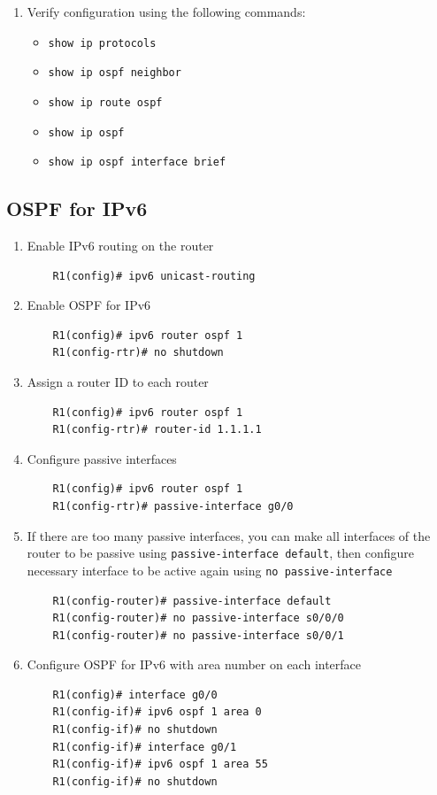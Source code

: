 \begin{enumerate}
\item Verify configuration using the following commands:
	\begin{itemize}
	\item \verb|show ip protocols|
	\item \verb|show ip ospf neighbor|
	\item \verb|show ip route ospf|
	\item \verb|show ip ospf|
	\item \verb|show ip ospf interface brief|
	\end{itemize}		
\end{enumerate}

\subsection{OSPF for IPv6}

\begin{enumerate}
\item Enable IPv6 routing on the router
	\begin{verbatim}
	R1(config)# ipv6 unicast-routing 
	\end{verbatim}
	
\item Enable OSPF for IPv6
	\begin{verbatim}
	R1(config)# ipv6 router ospf 1 
	R1(config-rtr)# no shutdown 
	\end{verbatim}	
	
\item Assign a router ID to each router
	\begin{verbatim}
	R1(config)# ipv6 router ospf 1 
	R1(config-rtr)# router-id 1.1.1.1
	\end{verbatim}

\item Configure passive interfaces
	\begin{verbatim}
	R1(config)# ipv6 router ospf 1 
	R1(config-rtr)# passive-interface g0/0 
	\end{verbatim}
	
\item If there are too many passive interfaces, you can make all interfaces of the router to be passive using \verb|passive-interface default|, then configure necessary interface to be active again using \verb|no passive-interface|
	\begin{verbatim}
	R1(config-router)# passive-interface default
	R1(config-router)# no passive-interface s0/0/0
	R1(config-router)# no passive-interface s0/0/1
	\end{verbatim}	
	
\item Configure OSPF for IPv6 with area number on each interface
	\begin{verbatim}
	R1(config)# interface g0/0 
	R1(config-if)# ipv6 ospf 1 area 0
	R1(config-if)# no shutdown
	R1(config-if)# interface g0/1       
	R1(config-if)# ipv6 ospf 1 area 55
	R1(config-if)# no shutdown
	\end{verbatim}     
	
\end{enumerate}	

